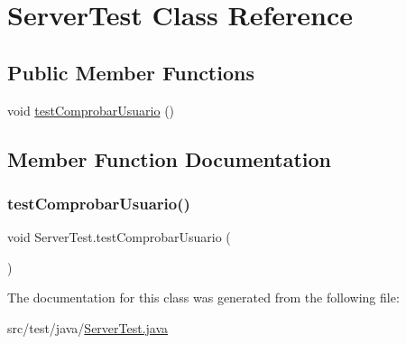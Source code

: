 \hypertarget{class_server_test}{}\section{Server\+Test Class Reference}
\label{class_server_test}
\subsection*{Public Member Functions}
\begin{DoxyCompactItemize}
\item 
void \mbox{\hyperlink{class_server_test_a7dc778001059c1afb131eb57d82aac8b}{test\+Comprobar\+Usuario}} ()
\end{DoxyCompactItemize}


\subsection{Member Function Documentation}
\mbox{\label{class_server_test_a7dc778001059c1afb131eb57d82aac8b}} 
\subsubsection{\texorpdfstring{testComprobarUsuario()}{testComprobarUsuario()}}
{\footnotesize\ttfamily void Server\+Test.\+test\+Comprobar\+Usuario (\begin{DoxyParamCaption}{ }\end{DoxyParamCaption})}



The documentation for this class was generated from the following file\+:\begin{DoxyCompactItemize}
\item 
src/test/java/\mbox{\hyperlink{_server_test_8java}{Server\+Test.\+java}}\end{DoxyCompactItemize}
